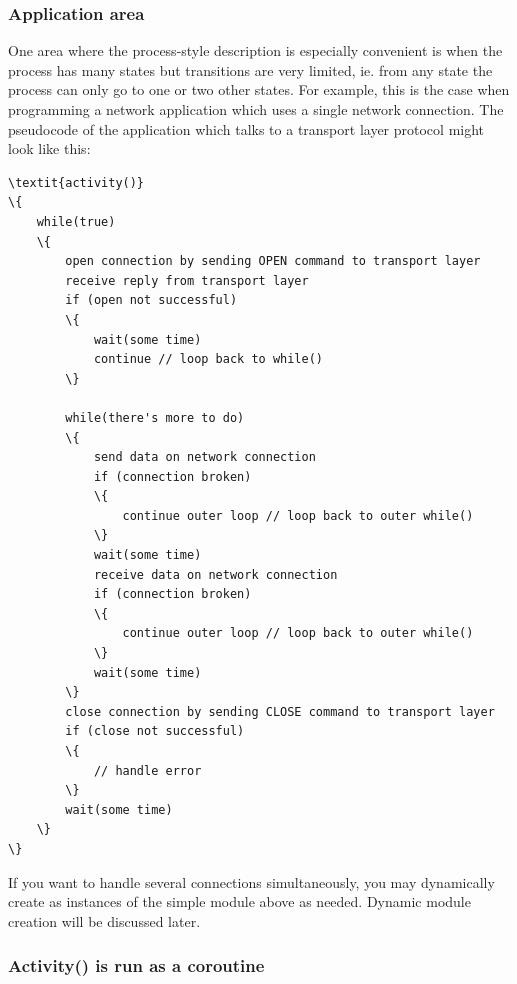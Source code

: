 \subsubsection{Application area}


One area where the process-style description is especially convenient is when the process has many
states but transitions are very limited, ie. from any state the
process can only go to one or two other states.  For example, this is
the case when programming a network application which uses a single
network connection.  The pseudocode of the application which talks to
a transport layer protocol might look like this:

\begin{Verbatim}[commandchars=\\\{\}]
\textit{activity()}
\{
    while(true)
    \{
        open connection by sending OPEN command to transport layer
        receive reply from transport layer
        if (open not successful)
        \{
            wait(some time)
            continue // loop back to while()
        \}

        while(there's more to do)
        \{
            send data on network connection
            if (connection broken)
            \{
                continue outer loop // loop back to outer while()
            \}
            wait(some time)
            receive data on network connection
            if (connection broken)
            \{
                continue outer loop // loop back to outer while()
            \}
            wait(some time)
        \}
        close connection by sending CLOSE command to transport layer
        if (close not successful)
        \{
            // handle error
        \}
        wait(some time)
    \}
\}
\end{Verbatim}



If you want to handle several connections simultaneously, you may
dynamically create as instances of the simple
module above as needed. Dynamic module creation will be discussed
later.


\subsubsection{Activity() is run as a coroutine}


